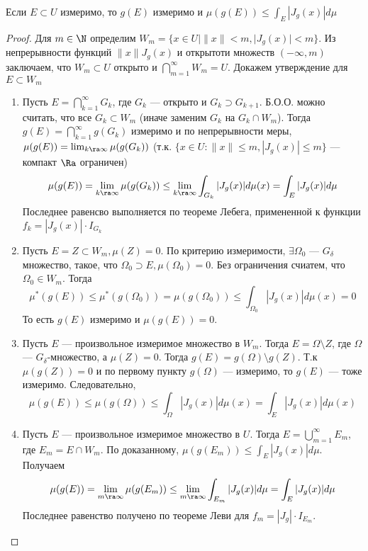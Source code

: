 
\begin{lemma}
    Если \(E \subset U\) измеримо, то \(g(E)\) измеримо и \(\mu(g(E)) \le \int_E |J_g(x)| d\mu\)
\end{lemma}
\begin{proof}
    Для \(m \in \N\) определим \(W_m = \{x \in U | \|x\| < m, |J_g(x)| < m\}\). Из непрерывности функций \(\|x\|J_g(x)\) и открытоти множеств \((-\infty, m)\) заключаем, что \(W_m \subset U\) открыто и \(\bigcap_{m = 1}^\infty W_m = U\). Докажем утверждение для \(E \subset W_m\)
    \begin{enumerate}
        \item Пусть \(E = \bigcap_{k = 1}^\infty G_k\), где \(G_k\) --- открыто и \(G_k \supset G_{k + 1}\). Б.О.О. можно считать, что все \(G_k \subset W_m\) (иначе заменим \(G_k\) на \(G_k \cap W_m\)). Тогда \(g(E) = \bigcap_{k = 1}^\infty g(G_k)\) измеримо и по непрерывности меры, \(\mu(g(E)) = \lim_{k \ra \infty}\mu(g(G_k))\) (т.к. \(\{x \in U: \|x\| \le m, |J_g(x)| \le m\}\) --- компакт \(\Ra\) ограничен)
        \[\mu(g(E)) = \lim_{k \ra \infty}\mu(g(G_k)) \le \lim_{k \ra \infty}\int_{G_k}|J_g(x)|d\mu(x) = \int_E |J_g(x)|d\mu\]
        Последнее равенсво выполняется по теореме Лебега, примененной к функции \(f_k = |J_g(x)|\cdot I_{G_k}\)

        \item Пусть \(E = Z \subset W_m, \mu(Z) = 0\). По критерию измеримости, \(\exists \Omega_0\) --- \(G_\delta\) множество, такое, что \(\Omega_0 \supset E, \mu(\Omega_0) = 0\). Без ограничения счиатем, что \(\Omega_0 \in W_m\). Тогда 
        \[\mu^*(g(E)) \le \mu^*(g(\Omega_0)) = \mu(g(\Omega_0)) \le \int_{\Omega_0}|J_g(x)|d\mu(x) = 0\]
        То есть \(g(E)\) измеримо и \(\mu(g(E)) = 0\).

        \item Пусть \(E\) --- произвольное измеримое множество в \(W_m\). Тогда \(E = \Omega \setminus Z\), где \(\Omega\) --- \(G_\delta\)-множество, а \(\mu(Z) = 0\). Тогда \(g(E) = g(\Omega) \setminus g(Z)\). Т.к \(\mu(g(Z)) = 0\) и по первому пункту \(g(\Omega)\) --- измеримо, то \(g(E)\) --- тоже измеримо. Следовательно,
        \[\mu(g(E)) \le \mu(g(\Omega)) \le \int_\Omega |J_g(x)|d\mu(x) = \int_E |J_g(x)|d\mu(x)\]

        \item Пусть \(E\) --- произвольное измеримое множество в \(U\). Тогда \(E = \bigcup_{m = 1}^\infty E_m\), где \(E_m = E \cap W_m\). По доказанному, \(\mu(g(E_m)) \le \int_E |J_g(x)|d\mu\). Получаем
        \[\mu(g(E)) = \lim_{m \ra \infty} \mu(g(E_m)) \le \lim_{m \ra \infty} \int_{E_m} |J_g(x)|d\mu= \int_E |J_g(x)|d\mu\]
        Последнее равенство получено по теореме Леви для \(f_m = |J_g|\cdot I_{E_m}\).
    \end{enumerate}
\end{proof}

